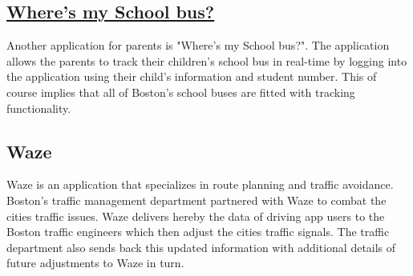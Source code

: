 \documentclass[a4paper,12pt]{report}
\begin{document}
		\subsection[Where's my School bus?]{\href{https://schoolbus.bostonpublicschools.org//}{Where's my School bus?}}
		\startsubsection
		Another application for parents is "Where's my School bus?". The application allows the parents to track their children's school bus in real-time by logging into the application using their child's information and student number. This of course implies that all of Boston's school buses are fitted with tracking functionality.
		\closesection		
		\subsection[Waze]{Waze \cite{InformationSuperhighway}}
		\startsubsection
			Waze is an application that specializes in route planning and traffic avoidance.
	Boston's traffic management department partnered with Waze to combat the cities traffic issues. Waze delivers hereby the data of driving app users to the Boston traffic engineers which then adjust the cities traffic signals. The traffic department also sends back this updated information with additional details of future adjustments to Waze in turn.
		\closesection
\end{document}
